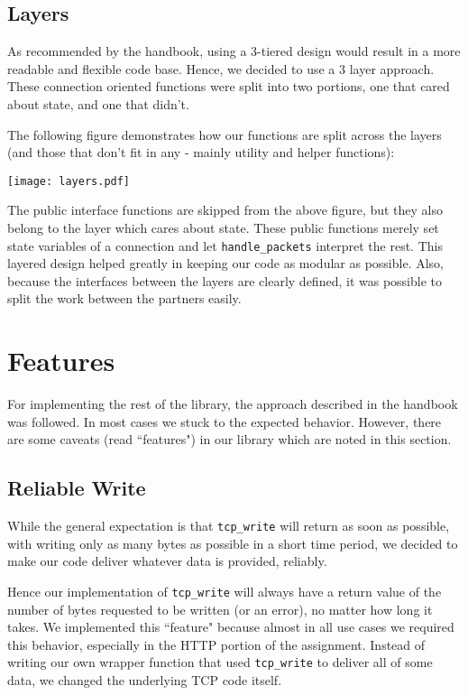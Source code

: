 \documentclass{article}
\begin{document}
\subsection{Layers}
As recommended by the handbook, using a 3-tiered design would result in a more readable and flexible code base. Hence, we decided to use a 3 layer approach. These connection oriented functions were split into two portions, one that cared about state, and one that didn't.

The following figure demonstrates how our functions are split across the layers (and those that don't fit in any - mainly utility and helper functions):

\texttt{[image: layers.pdf]}

The public interface functions are skipped from the above figure, but they also belong to the layer which cares about state. These public functions merely set state variables of a connection and let \texttt{handle\_packets} interpret the rest. This layered design helped greatly in keeping our code as modular as possible. Also, because the interfaces between the layers are clearly defined, it was possible to split the work between the partners easily.

\section{Features}
For implementing the rest of the library, the approach described in the handbook was followed. In most cases we stuck to the expected behavior. However, there are some caveats (read ``features") in our library which are noted in this section.

\subsection{Reliable Write}
 While the general expectation is that \texttt{tcp\_write} will return as soon as possible, with writing only as many bytes as possible in a short time period, we decided to make our code deliver whatever data is provided, reliably. 

Hence our implementation of \texttt{tcp\_write} will always have a return value of the number of bytes requested to be written (or an error), no matter how long it takes. We implemented this ``feature" because almost in all use cases we required this behavior, especially in the HTTP portion of the assignment. Instead of writing our own wrapper function that used  \texttt{tcp\_write} to deliver all of some data, we changed the underlying TCP code itself.
\end{document}
